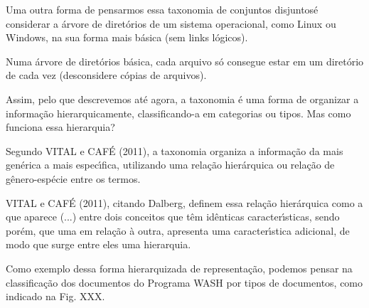 \documentclass[
12pt,		%
openright,	%
twoside,  %
a4paper,			%
chapter=TITLE,		%
english,			%
french,				%
spanish,			%
brazil				%
]{USPSC-classe/USPSC}
\begin{document}
Uma outra forma de pensarmos essa \textquotedbl taxonomia de conjuntos disjuntos\textquotedbl  \'e considerar a \'arvore de diret\'orios de um sistema operacional, como Linux ou Windows, na sua forma mais b\'asica (sem links l\'ogicos).









Numa \'arvore de diret\'orios b\'asica, cada arquivo s\'o consegue estar em um diret\'orio de cada vez (desconsidere c\'opias de arquivos).









Assim, pelo que descrevemos at\'e agora, a taxonomia \'e uma forma de organizar a informa\c{c}\~ao hierarquicamente, classificando-a em categorias ou tipos. Mas como funciona essa hierarquia?









Segundo  VITAL e CAF\'E (2011), \textquotedbl a taxonomia organiza a informa\c{c}\~ao da mais gen\'erica a mais espec\'{\i}fica, utilizando uma rela\c{c}\~ao hier\'arquica ou rela\c{c}\~ao de g\^enero-esp\'ecie entre os termos\textquotedbl .









 VITAL e CAF\'E (2011), citando Dalberg, definem essa rela\c{c}\~ao hier\'arquica como a que aparece \textquotedbl (...) entre dois conceitos que t\^em id\^enticas caracter\'{\i}sticas, sendo por\'em, que uma em rela\c{c}\~ao \`a outra, apresenta uma caracter\'{\i}stica adicional, de modo que surge entre eles uma hierarquia\textquotedbl .









Como exemplo dessa forma hierarquizada de representa\c{c}\~ao, podemos pensar na classifica\c{c}\~ao dos documentos do Programa WASH por tipos de documentos, como indicado na Fig. XXX.
\end{document}
